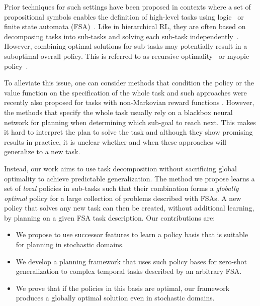 Prior techniques for such settings have been proposed in contexts where a set of propositional symbols enables the definition of high-level tasks using logic~\citep{Vaezipoor2021, ToroIcarte2019}
or finite state automata (FSA)~\cite{Icarte2018}. Like in hierarchical RL,
they are often based on decomposing tasks into sub-tasks and solving each sub-task independently~\citep{Dietterich2000, Sutton1999}. 
However, combining optimal solutions for sub-tasks may potentially result in a suboptimal overall policy. 
This is referred to as recursive optimality~\cite{Dietterich2000} or myopic policy~\cite{Vaezipoor2021}. 

To alleviate this issue, one can consider methods that condition the policy or the value function on the specification of the whole task \citep{UVF} and such approaches were recently also proposed for tasks with non-Markovian reward functions \cite{Vaezipoor2021}. However, the methods that specify the whole task usually rely on a blackbox neural network for planning when determining which sub-goal to reach next. This makes it hard to interpret the plan to solve the task and although  they show promising results in practice, %
it is unclear whether and when these approaches will generalize to a new task.


Instead, our work aims to use task decomposition without sacrificing global optimality to achieve predictable generalization. The method we propose learns a set of \textit{local} policies in sub-tasks such that their combination forms a \textit{globally optimal} policy for a large collection of problems described with FSAs. A new policy that solves any new task can then be created, without additional learning, by planning on a given FSA task description. Our contributions are:
 \begin{itemize}
    \item We propose to use successor features to learn a policy basis that is suitable for planning in stochastic domains.
    \item We develop a planning framework that uses such policy bases for zero-shot generalization to complex temporal tasks described by an arbitrary FSA.
    \item We prove that if the policies in this basis are optimal, our framework produces a globally optimal solution even in stochastic domains.
\end{itemize}





